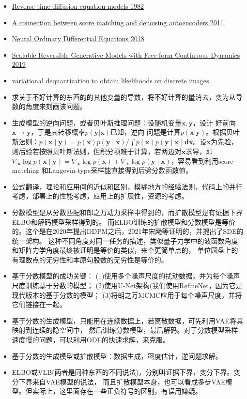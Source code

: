 \documentclass[lang=cn,newtx,10pt,scheme=chinese]{elegantbook}
\begin{document}
\begin{itemize}
  \item \href{B.D}{Reverse-time diffusion equation models 1982}
  \item \href{c.c}{A connection between score matching and denoising autoencoders 2011} 
  \item \href{n.c}{Neural Ordinary Differential Equations 2018}
  \item \href{s.c}{Scalable Reversible Generative Models with Free-form Continuous Dynamics 2019}
  \item variational dequantization to obtain likelihoods on discrete images
  \item 求关于不好计算的东西的的其他变量的导数，将不好计算的量消去，变为从导数的角度来刻画该问题。
  \item 生成模型的逆向问题，或者贝叶斯推理问题：设随机变量$\mathbf{x}, \mathbf{y}$，设计
  好前向$\mathbf{x} \rightarrow \mathbf{y}$，于是其转移概率$p(\mathbf{y}|\mathbf{x})$已知，逆向
  问题是计算$p(\mathbf{x}|\mathbf{y})$。根据贝叶斯法则：$p(\mathbf{x} \mid \mathbf{y})=p(\mathbf{x}) p(\mathbf{y} 
  \mid \mathbf{x}) / \int p(\mathbf{x}) p(\mathbf{y} \mid \mathbf{x}) \mathbf{d} \mathbf{x}$。设$\mathbf{x}$为先验，
  则后验若按照贝叶斯法则，但积分项难于计算，若两边对$\mathbf{x}$求导，即$\nabla_{\mathbf{x}} \log p(\mathbf{x} \mid \mathbf{y})=\nabla_{\mathbf{x}} \log p(\mathbf{x})+\nabla_{\mathbf{x}} \log p(\mathbf{y} \mid \mathbf{x})$，容易看到利用score matching 和Langevin-type采样能直接得到后验分数函数值。
  \item 公式翻译，理论和应用间的近似和区别，模糊地方的经验法则，代码上的并行考虑，部署上的性能考虑，应用上的扩展性，资源的考虑。
  \item 分数模型是从分数匹配和郎之万动力采样中得到的，而扩散模型是有证据下界ELBO和解码模型采样得到的。
  而ELBO训练的扩散模型和分数模型是等价的。这个是在2020年提出DDPM之后，2021年宋飏等证明的，并提出了SDE的统一架构。
  这种不同角度对同一任务的描述，类似量子力学中的波函数角度和矩阵力学角度最终被证明是等价的类似，来个更简单点的，
  单位圆盘上的有理数点的无穷性和本原勾股数的无穷性是等价的。
  \item 基于分数模型的成功关键：
  (1)使用多个噪声尺度的扰动数据，并为每个噪声尺度训练基于分数的模型；
  (2)使用U-Net架构(我们使用RefineNet，因为它是现代版本的基于分数的模型；
  (3)将朗之万MCMC应用于每个噪声尺度，并将它们链接在一起。
  \item 基于分数的生成模型，只能用在连续数据上，若离散数据，可先利用VAE将其映射到连续的隐空间中，
  然后训练分数模型，最后解码。对于分数模型采样速度慢的问题，可以利用ODE的快速求解，来克服。 
  \item 基于分数的生成模型或扩散模型：数据生成，密度估计，逆问题求解。
  \item ELBO或VLB(两者是同种东西的不同说法)，分别叫证据下界，变分下界。变分下界来自VAE模型的说法，
  而且扩散模型本身，也可以看成多步VAE模型。但实际上，这里面存在一些正负符号的区别，有误用嫌疑。
  

\end{itemize}
\end{document}

